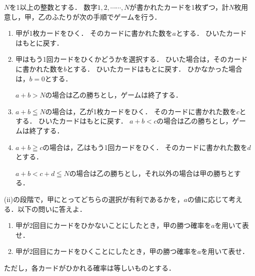 \documentclass[../../main.tex]{subfiles}
\begin{document}
$N$を1以上の整数とする．
数字$1,2,\cdots\cdots,N$が書かれたカードを1枚ずつ，計$N$枚用意し，甲，乙のふたりが次の手順でゲームを行う．
\begin{enumerate}
  \item[(i)] 甲が1枚カードをひく．
    そのカードに書かれた数を$a$とする．
    ひいたカードはもとに戻す．
  \item[(ii)] 甲はもう1回カードをひくかどうかを選択する．
    ひいた場合は，そのカードに書かれた数を$b$とする．
    ひいたカードはもとに戻す．
    ひかなかった場合は，$b=0$とする．

    $a+b>N$の場合は乙の勝ちとし，ゲームは終了する．
  \item[(iii)] $a+b \leqq N$の場合は，乙が1枚カードをひく．
    そのカードに書かれた数を$c$とする．
    ひいたカードはもとに戻す．
    $a+b<c$の場合は乙の勝ちとし，ゲームは終了する．
  \item[(iv)] $a+b \geqq c$の場合は，乙はもう1回カードをひく．
    そのカードに書かれた数を$d$とする．

    $a+b<c+d \leqq N$の場合は乙の勝ちとし，それ以外の場合は甲の勝ちとする．
\end{enumerate}
(ii)の段階で，甲にとってどちらの選択が有利であるかを，$a$の値に応じて考える．以下の問いに答えよ．
\begin{enumerate}
  \item 甲が2回目にカードをひかないことにしたとき，甲の勝つ確率を$a$を用いて表せ．
  \item 甲が2回目にカードをひくことにしたとき，甲の勝つ確率を$a$を用いて表せ．
\end{enumerate}
ただし，各カードがひかれる確率は等しいものとする．
\end{document}
